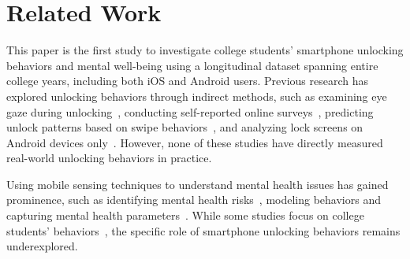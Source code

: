 \vspace{-2pt}
\section{Related Work}\label{literature}
\vspace{-2pt}
This paper is the first study to investigate college students' smartphone unlocking behaviors and mental well-being using a longitudinal dataset spanning entire college years, including both iOS and Android users.
Previous research has explored unlocking behaviors through indirect methods, such as examining eye gaze during unlocking~\cite{abdrabou2024eyegaze}, conducting self-reported online surveys~\cite{harbach2014survey}, predicting unlock patterns based on swipe behaviors~\cite{li2019swipevlock}, and analyzing lock screens on Android devices only~\cite{harbach2016anatomy}. However, none of these studies have directly measured real-world unlocking behaviors in practice.

Using mobile sensing techniques to understand mental health issues has gained prominence, such as identifying mental health risks~\cite{adler2022machine, faurholt2019objective, wang2022first}, modeling behaviors and capturing mental health parameters~\cite{likamwa2013moodscope, macleod2021mobile, mehrotra2017mytraces, tag2022emotion}. While some studies focus on college students' behaviors~\cite{macleod2021mobile, meegahapola2020smartphone, meegahapola2023generalization, wang2021transition}, the specific role of smartphone unlocking behaviors remains underexplored.



